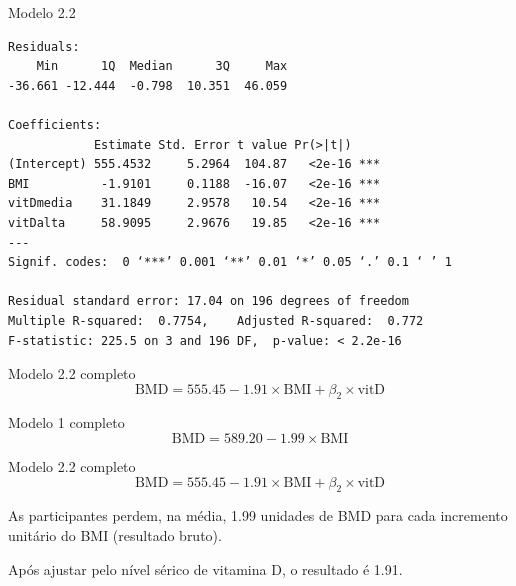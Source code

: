 \documentclass{beamer}
\begin{document}
\begin{frame}[fragile]{\scriptsize }
  \begin{center}
    \begin{exampleblock}{Modelo 2.2}
      \tiny
\begin{verbatim}
Residuals:
    Min      1Q  Median      3Q     Max 
-36.661 -12.444  -0.798  10.351  46.059 

Coefficients:
            Estimate Std. Error t value Pr(>|t|)    
(Intercept) 555.4532     5.2964  104.87   <2e-16 ***
BMI          -1.9101     0.1188  -16.07   <2e-16 ***
vitDmedia    31.1849     2.9578   10.54   <2e-16 ***
vitDalta     58.9095     2.9676   19.85   <2e-16 ***
---
Signif. codes:  0 ‘***’ 0.001 ‘**’ 0.01 ‘*’ 0.05 ‘.’ 0.1 ‘ ’ 1

Residual standard error: 17.04 on 196 degrees of freedom
Multiple R-squared:  0.7754,	Adjusted R-squared:  0.772 
F-statistic: 225.5 on 3 and 196 DF,  p-value: < 2.2e-16
\end{verbatim}
    \end{exampleblock}
  \begin{exampleblock}{Modelo 2.2 completo}
    \scriptsize
    \begin{displaymath}
      \text{BMD} =555.45 -1.91 \times\text{BMI} + \beta_2 \times\text{vitD}
    \end{displaymath}
  \end{exampleblock}
  \end{center}
\end{frame}

\begin{frame}{\scriptsize }
  \begin{exampleblock}{Modelo 1 completo}
    \tiny
    \begin{displaymath}
      \text{BMD} =589.20 -1.99 \times\text{BMI}
    \end{displaymath}
  \end{exampleblock}
  \begin{exampleblock}{Modelo 2.2 completo}
    \scriptsize
    \begin{displaymath}
      \text{BMD} =555.45 -1.91 \times\text{BMI} + \beta_2 \times\text{vitD}
    \end{displaymath}
  \end{exampleblock}
  \begin{block}{}
    \footnotesize
    As participantes perdem, na média, 1.99 unidades de BMD para cada incremento unitário do BMI (resultado bruto).

    \bigskip
    Após ajustar pelo nível sérico de vitamina D, o resultado é 1.91.
  \end{block}
\end{frame}
\end{document}

